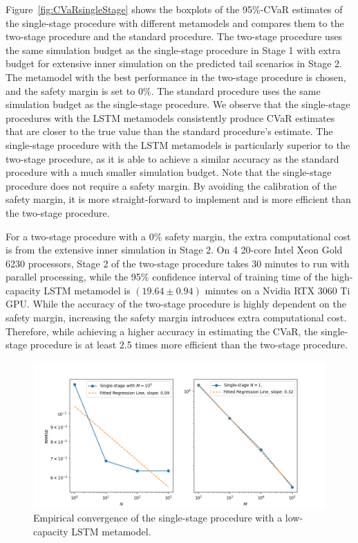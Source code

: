 \documentclass{article}
\begin{document}
Figure~\ref{fig:CVaRsingleStage} shows the boxplots of the 95\%-CVaR estimates of the single-stage procedure with different metamodels and compares them to the two-stage procedure and the standard procedure.
The two-stage procedure uses the same simulation budget as the single-stage procedure in Stage 1 with extra budget for extensive inner simulation on the predicted tail scenarios in Stage 2.
The metamodel with the best performance in the two-stage procedure is chosen, and the safety margin is set to 0\%.
The standard procedure uses the same simulation budget as the single-stage procedure.
We observe that the single-stage procedures with the LSTM metamodels consistently produce CVaR estimates that are closer to the true value than the standard procedure's estimate.
The single-stage procedure with the LSTM metamodels is particularly superior to the two-stage procedure, as it is able to achieve a similar accuracy as the standard procedure with a much smaller simulation budget.
Note that the single-stage procedure does not require a safety margin.
By avoiding the calibration of the safety margin, it is more straight-forward to implement and is more efficient than the two-stage procedure.

For a two-stage procedure with a 0\% safety margin, the extra computational cost is from the extensive inner simulation in Stage 2.
On 4 20-core Intel Xeon Gold 6230 processors, Stage 2 of the two-stage procedure takes 30 minutes to run with parallel processing, while the 95\% confidence interval of training time of the high-capacity LSTM metamodel is $(19.64 \pm 0.94)$ minutes on a Nvidia RTX 3060 Ti GPU.
While the accuracy of the two-stage procedure is highly dependent on the safety margin, increasing the safety margin introduces extra computational cost.
Therefore, while achieving a higher accuracy in estimating the CVaR, the single-stage procedure is at least 2.5 times more efficient than the two-stage procedure.


\begin{figure}[ht!]
    \centering
    \includegraphics[width=\textwidth]{./figures/singleStage/mnConvergenceLoCap.png}
    \caption{Empirical convergence of the single-stage procedure with a low-capacity LSTM metamodel.} 
    \label{fig:mnConvergence}
\end{figure}
\end{document}
